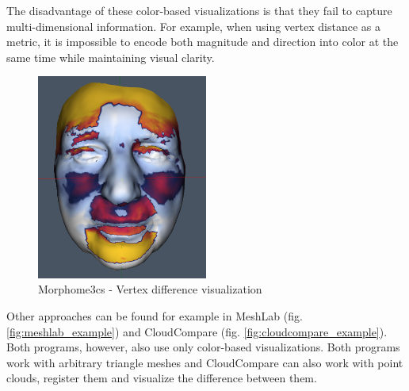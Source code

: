 The disadvantage of these color-based visualizations is that they fail to capture multi-dimensional information. For example, when using vertex distance as a metric, it is impossible to encode both magnitude and direction into color at the same time while maintaining visual clarity.

\begin{figure}[h]
\centering
\includegraphics[width=0.5\textwidth]{./img/morpho-example01.PNG}
\caption{Morphome3cs - Vertex difference visualization}
\label{fig:morpho_example}
\end{figure}

Other approaches can be found for example in MeshLab (fig. \ref{fig:meshlab_example}) and CloudCompare (fig. \ref{fig:cloudcompare_example}). Both programs, however, also use only color-based visualizations. Both programs work with arbitrary triangle meshes and CloudCompare can also work with point clouds, register them and visualize the difference between them.

